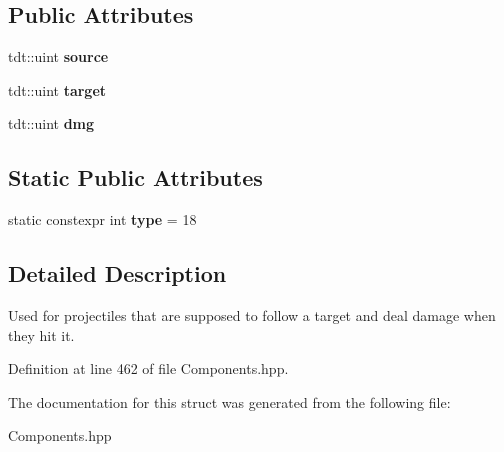 \subsection*{Public Attributes}
\begin{DoxyCompactItemize}
\item 
tdt\+::uint {\bfseries source}\hypertarget{struct_homing_component_a1cba9a813cd94e823ddc42bae1e4996b}{}\label{struct_homing_component_a1cba9a813cd94e823ddc42bae1e4996b}

\item 
tdt\+::uint {\bfseries target}\hypertarget{struct_homing_component_a71840e328968a719ea0bc1404a01b26e}{}\label{struct_homing_component_a71840e328968a719ea0bc1404a01b26e}

\item 
tdt\+::uint {\bfseries dmg}\hypertarget{struct_homing_component_a085f9ca647fbae4cbf19e12f061befba}{}\label{struct_homing_component_a085f9ca647fbae4cbf19e12f061befba}

\end{DoxyCompactItemize}
\subsection*{Static Public Attributes}
\begin{DoxyCompactItemize}
\item 
static constexpr int {\bfseries type} = 18\hypertarget{struct_homing_component_a6797c2200b17f50e39b69e9ff0d005c4}{}\label{struct_homing_component_a6797c2200b17f50e39b69e9ff0d005c4}

\end{DoxyCompactItemize}


\subsection{Detailed Description}
Used for projectiles that are supposed to follow a target and deal damage when they hit it. 

Definition at line 462 of file Components.\+hpp.



The documentation for this struct was generated from the following file\+:\begin{DoxyCompactItemize}
\item 
Components.\+hpp\end{DoxyCompactItemize}
